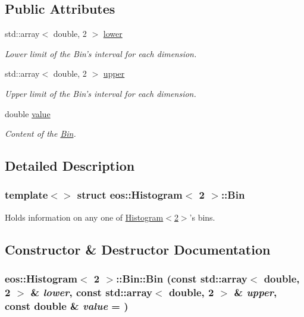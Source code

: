 \subsection*{Public Attributes}
\begin{DoxyCompactItemize}
\item 
std::array$<$ double, 2 $>$ \hyperlink{structeos_1_1Histogram_3_012_01_4_1_1Bin_a1e425081536674ebe0303fbdeede8cd2}{lower}
\begin{DoxyCompactList}\small\item\em Lower limit of the Bin's interval for each dimension. \item\end{DoxyCompactList}\item 
std::array$<$ double, 2 $>$ \hyperlink{structeos_1_1Histogram_3_012_01_4_1_1Bin_a3202307a2d3e2768e7c7a5eaebca2a60}{upper}
\begin{DoxyCompactList}\small\item\em Upper limit of the Bin's interval for each dimension. \item\end{DoxyCompactList}\item 
double \hyperlink{structeos_1_1Histogram_3_012_01_4_1_1Bin_a060dd2645bb259a8ea810052c6efaa63}{value}
\begin{DoxyCompactList}\small\item\em Content of the \hyperlink{structeos_1_1Histogram_3_012_01_4_1_1Bin}{Bin}. \item\end{DoxyCompactList}\end{DoxyCompactItemize}


\subsection{Detailed Description}
\subsubsection*{template$<$$>$ struct eos::Histogram$<$ 2 $>$::Bin}

Holds information on any one of \hyperlink{classeos_1_1Histogram_3_012_01_4}{Histogram$<$2$>$}'s bins. 

\subsection{Constructor \& Destructor Documentation}
\hypertarget{structeos_1_1Histogram_3_012_01_4_1_1Bin_ad3b75a64e6a8499a4abddaad4943aeac}{
\subsubsection[{Bin}]{\setlength{\rightskip}{0pt plus 5cm}eos::Histogram$<$ 2 $>$::Bin::Bin (const std::array$<$ double, 2 $>$ \& {\em lower}, \/  const std::array$<$ double, 2 $>$ \& {\em upper}, \/  const double \& {\em value} = {})}}
\label{structeos_1_1Histogram_3_012_01_4_1_1Bin_ad3b75a64e6a8499a4abddaad4943aeac}


